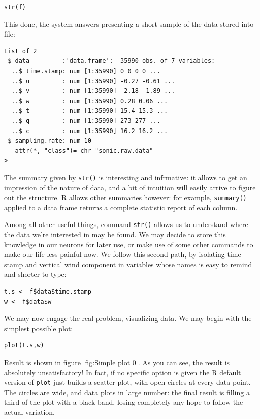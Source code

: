 \documentclass[a4paper,10pt]{book}
\begin{document}
\begin{verbatim}
str(f)
\end{verbatim}

This done, the system answers presenting a short sample of the data stored into file:

\begin{verbatim}
List of 2
 $ data         :'data.frame':	35990 obs. of 7 variables:
  ..$ time.stamp: num [1:35990] 0 0 0 0 ...
  ..$ u         : num [1:35990] -0.27 -0.61 ...
  ..$ v         : num [1:35990] -2.18 -1.89 ...
  ..$ w         : num [1:35990] 0.28 0.06 ...
  ..$ t         : num [1:35990] 15.4 15.3 ...
  ..$ q         : num [1:35990] 273 277 ...
  ..$ c         : num [1:35990] 16.2 16.2 ...
 $ sampling.rate: num 10
 - attr(*, "class")= chr "sonic.raw.data"
>
\end{verbatim}

The summary given by \verb|str()| is interesting and infrmative: it allows to get an impression of the nature of data, and a bit of intuition will easily arrive to figure out the structure. R allows other summaries however: for example, \verb|summary()| applied to a data frame returns a complete statistic report of each column.

Among all other useful things, command \verb|str()| allows us to understand where the data we're interested in may be found. We may decide to store this knowledge in our neurons for later use, or make use of some other commands to make our life less painful now. We follow this second path, by isolating time stamp and vertical wind component in variables whose names is easy to remind and shorter to type:

\begin{verbatim}
t.s <- f$data$time.stamp
w <- f$data$w
\end{verbatim}

We may now engage the real problem, visualizing data. We may begin with the simplest possible plot:

\begin{verbatim}
plot(t.s,w)
\end{verbatim}

Result is shown in figure \ref{fig:Simple plot 0}. As you can see, the result is absolutely unsatisfactory! In fact, if no specific option is given the R default version of \verb|plot| just builds a scatter plot, with open circles at every data point. The circles are wide, and data plots in large number: the final result is filling a third of the plot with a black band, losing completely any hope to follow the actual variation.
\end{document}
